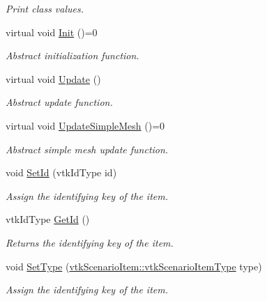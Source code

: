 \begin{DoxyCompactItemize}
\begin{DoxyCompactList}\small\item\em Print class values. \item\end{DoxyCompactList}\item 
virtual void \hyperlink{classvtkScenarioItem_a87f01894de62f23433aa2eb3f995c216}{Init} ()=0
\begin{DoxyCompactList}\small\item\em Abstract initialization function. \item\end{DoxyCompactList}\item 
virtual void \hyperlink{classvtkScenarioItem_ad29b7f2958399100f919b4eb9627fbc1}{Update} ()
\begin{DoxyCompactList}\small\item\em Abstract update function. \item\end{DoxyCompactList}\item 
virtual void \hyperlink{classvtkScenarioItem_a75b837f36e8f79f51999dc1a7eecbe4b}{UpdateSimpleMesh} ()=0
\begin{DoxyCompactList}\small\item\em Abstract simple mesh update function. \item\end{DoxyCompactList}\item 
void \hyperlink{classvtkScenarioItem_afd99a6db7187837d0129e9898478ec60}{SetId} (vtkIdType id)
\begin{DoxyCompactList}\small\item\em Assign the identifying key of the item. \item\end{DoxyCompactList}\item 
vtkIdType \hyperlink{classvtkScenarioItem_a9884061bd42ee058291d95a67ddcac20}{GetId} ()
\begin{DoxyCompactList}\small\item\em Returns the identifying key of the item. \item\end{DoxyCompactList}\item 
void \hyperlink{classvtkScenarioItem_a9bf24104bbf25c469fa151816afdcb52}{SetType} (\hyperlink{classvtkScenarioItem_a77bcdf6979a30db08fa7934f218994e0}{vtkScenarioItem::vtkScenarioItemType} type)
\begin{DoxyCompactList}\small\item\em Assign the identifying key of the item. \item\end{DoxyCompactList}\item 

\end{DoxyCompactItemize}
